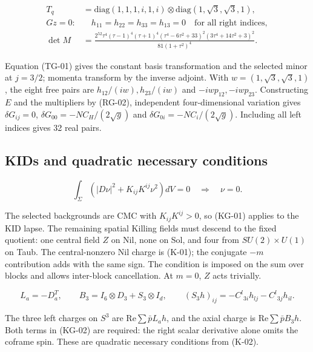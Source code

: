 \begin{equation}\tag{TG-01}\label{eq:TG-01}
\begin{aligned}
T_q&=\mathrm{diag}(1,1,1,i,1,i)\otimes\mathrm{diag}(1,\sqrt3,\sqrt3,1),\\
Gz=0:&\quad h_{11}=h_{22}=h_{33}=h_{13}=0\quad\text{for all right indices},\\
\det M&=\frac{2^{52}\tau^4(\tau-1)^4(\tau+1)^4
(\tau^4-6\tau^2+33)^2(3\tau^4+14\tau^2+3)^2}{81(1+\tau^2)^4}.
\end{aligned}
\end{equation}

Equation (TG-01) gives the constant basis transformation and the selected minor at $j=3/2$; momenta transform by the inverse adjoint. With $w=(1,\sqrt3,\sqrt3,1)$, the eight free pairs are $h_{12}/(iw),h_{23}/(iw)$ and $-iwp_{12},-iwp_{23}$. Constructing $E$ and the multipliers by (RG-02), independent four-dimensional variation gives $\delta G_{ij}=0$, $\delta G_{00}=-NC_H/(2\sqrt g)$ and $\delta G_{0i}=-NC_i/(2\sqrt g)$. Including all left indices gives 32 real pairs.

\subsection{KIDs and quadratic necessary conditions}

\begin{equation}\tag{KG-01}\label{eq:KG-01}
\int_\Sigma\left(|D\nu|^2+K_{ij}K^{ij}\nu^2\right)dV=0
\quad\Longrightarrow\quad\nu=0.
\end{equation}

The selected backgrounds are CMC with $K_{ij}K^{ij}>0$, so (KG-01) applies to the KID lapse. The remaining spatial Killing fields must descend to the fixed quotient: one central field $Z$ on Nil, none on Sol, and four from $SU(2)\times U(1)$ on Taub. The central-nonzero Nil charge is (K-01); the conjugate $-m$ contribution adds with the same sign. The condition is imposed on the sum over blocks and allows inter-block cancellation. At $m=0$, $Z$ acts trivially.

\begin{equation}\tag{KG-02}\label{eq:KG-02}
L_a=-D_a^T,\qquad B_3=I_6\otimes D_3+S_3\otimes I_d,\qquad
(S_3h)_{ij}=-C^l{}_{3i}h_{lj}-C^l{}_{3j}h_{il}.
\end{equation}

The three left charges on $S^3$ are $\mathrm{Re}\sum\bar p L_ah$, and the axial charge is $\mathrm{Re}\sum\bar p B_3h$. Both terms in (KG-02) are required: the right scalar derivative alone omits the coframe spin. These are quadratic necessary conditions from (K-02).

